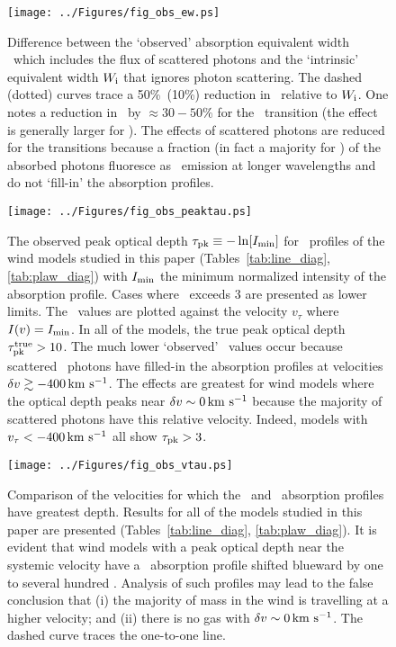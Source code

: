 \documentclass[12pt,preprint]{aastex}
\begin{document}
\begin{figure}
\texttt{[image: ../Figures/fig\_obs\_ew.ps]}
\caption{
Difference between the `observed' absorption equivalent width \ewabs\
which includes the flux of scattered photons and the `intrinsic'
equivalent width $W_{\rm i}$ that ignores photon scattering.  The
dashed (dotted) curves trace a 50\%\ (10\%) reduction in \ewabs\
relative to $W_{\rm i}$.  One notes a reduction in \ewabs\ by $\approx
30-50\%$ for the \mgiia\ transition (the effect is generally larger
for \mgiib).  The effects of scattered photons are reduced for the
\ion{Fe}{2} transitions because a fraction (in fact a majority for
\feiia) of the absorbed photons fluoresce as \feiis\ emission at
longer wavelengths and do not `fill-in' the absorption profiles.
}
\label{fig:obs_ew}
\end{figure}

\begin{figure}
\texttt{[image: ../Figures/fig\_obs\_peaktau.ps]}
\caption{
The observed peak optical depth $\tau_{\rm pk} \equiv -\ln [I_{\rm
  min}]$ for \mgiia\ profiles of the wind models studied in this paper
(Tables~\ref{tab:line_diag}, \ref{tab:plaw_diag}) with $I_{\rm min}$
the minimum normalized intensity of the absorption profile.  Cases
where \tpk\ exceeds 3 are presented as lower limits.  The \tpk\ values
are plotted against the velocity $v_\tau$ where $I(v) = I_{\rm min}$.  In all
of the models, the true peak optical depth $\tau_{\rm pk}^{\rm true} > 10$.
The much lower `observed' \tpk\ values occur because scattered \mgiia\
photons have filled-in the absorption profiles at velocities $\delta v
\gtrsim -400 \, {\rm km~s^{-1}}$. The effects are greatest for wind
models where the optical depth peaks near $\delta v \sim 0 \, {\rm km~s^{-1}}$ because
the majority of scattered photons have this relative velocity.
Indeed, models with $v_\tau < -400 \, {\rm km~s^{-1}}$ all show $\tau_{\rm pk} > 3$.
}
\label{fig:obs_peaktau}
\end{figure}

\begin{figure}
\texttt{[image: ../Figures/fig\_obs\_vtau.ps]}
\caption{
Comparison of the velocities for which the \feiia\ and \mgiia\ absorption
profiles have greatest depth.  Results for all of the models
studied in this paper are presented (Tables~\ref{tab:line_diag},
\ref{tab:plaw_diag}).  
It is evident that wind models with a peak optical depth near the
systemic velocity have a \mgiia\ absorption profile shifted blueward
by one to several hundred \kms.  Analysis of such profiles may lead to
the false conclusion 
that (i) the majority of mass in the wind is travelling at a higher
velocity; and (ii) there is no gas with $\delta v \sim 0 \, {\rm km~s^{-1}}$.
The dashed curve traces the one-to-one line.
}
\label{fig:obs_vtau}
\end{figure}
\end{document}
